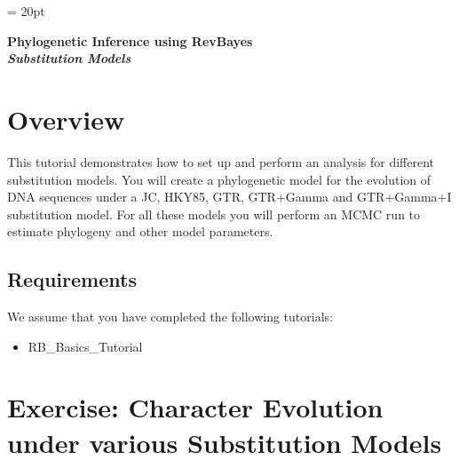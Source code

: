 \documentclass[11pt]{article}
\begin{document}
\renewcommand{\headrulewidth}{0.5pt}
\headsep = 20pt
\lhead{ }

\thispagestyle{plain}
\begin{center}

\textbf{\LARGE Phylogenetic Inference using RevBayes}\\\vspace{2mm}
\textbf{\it{\Large Substitution Models}}\\\vspace{2mm}
\end{center}

\section*{Overview}


This tutorial demonstrates how to set up and perform an analysis for different substitution models. 
You will create a phylogenetic model for the evolution of DNA sequences under a JC, HKY85, GTR, GTR+Gamma and GTR+Gamma+I substitution model.
For all these models you will perform an MCMC run to estimate phylogeny and other model parameters.

\subsection*{Requirements}
We assume that you have completed the following tutorials:
\begin{itemize}
\item RB\_Basics\_Tutorial
\end{itemize}



%
%
\newpage
\FloatBarrier
\section{Exercise: Character Evolution under various Substitution Models}

%
%
\end{document}
